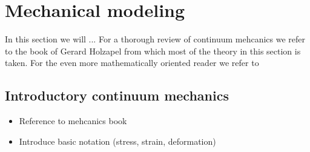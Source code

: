 \section{Mechanical modeling}
\label{sec:intro_mechanical}

In this section we will ...
For a thorough review of continuum mehcanics we refer
to the book of Gerard Holzapel \cite{holzapfel2000nonlinear} from
which most of the theory in this section is taken. For the even more
mathematically oriented reader we refer to \cite{marsden1994mathematical}

\subsection{Introductory continuum mechanics}

\begin{itemize}
  \item Reference to mehcanics book
  \item Introduce basic notation (stress, strain, deformation)
  \end{itemize}



